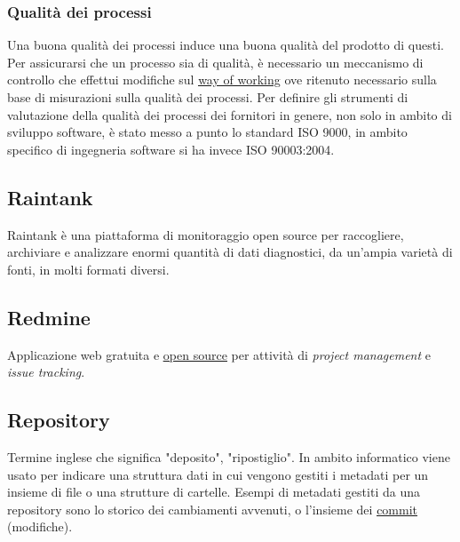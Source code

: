	\subsubsection{Qualità dei processi}
	\label{sec:qualitaprocesso}
	Una buona qualità dei processi induce una buona qualità del prodotto di questi. Per assicurarsi che un processo sia di qualità, è necessario un meccanismo di controllo che effettui modifiche sul \underline{\hyperref[sec:wow]{\underline{\hyperref[sec:wow]{way of working}}}} ove ritenuto necessario sulla base di misurazioni sulla qualità dei processi. Per definire gli strumenti di valutazione della qualità dei processi dei fornitori in genere, non solo in ambito di sviluppo software, è stato messo a punto lo standard ISO 9000, in ambito specifico di ingegneria software si ha invece ISO 90003:2004.
	
		\newpage

	\subsection{Raintank}
	\label{sec:raintank}
	Raintank è una piattaforma di monitoraggio open source per raccogliere, archiviare e analizzare enormi quantità di dati diagnostici, da un'ampia varietà di fonti, in molti formati diversi.
	
	\subsection{Redmine}
	\label{sec:redmine}
	Applicazione web gratuita e \underline{\hyperref[sec:opensource]{open source}} per attività di \emph{project management} e \emph{issue tracking}.
	
	\subsection{Repository}
	\label{sec:repo}
	Termine inglese che significa "deposito", "ripostiglio". In ambito informatico viene usato per indicare una struttura dati in cui vengono gestiti i metadati per un insieme di file o una strutture di cartelle. Esempi di metadati gestiti da una repository sono lo storico dei cambiamenti avvenuti, o l'insieme dei \underline{\hyperref[sec:commit]{commit}} (modifiche).

	
